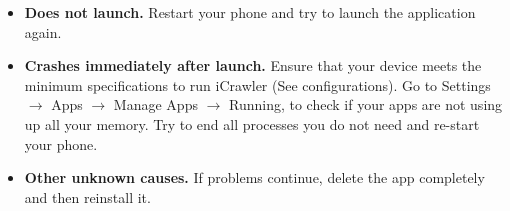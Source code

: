 \documentclass[hidelinks, 12pt, oneside]{article}
\begin{document}
	\begin{itemize}
		\item \textbf{Does not launch.} Restart your phone and try to launch the application again.
		\item\textbf{Crashes immediately after launch.} Ensure that your device meets the minimum specifications to run
		 iCrawler (See configurations). Go to Settings $\rightarrow$ Apps $\rightarrow$ Manage Apps $\rightarrow$ Running, to check if your apps are not using up all
		  your memory. Try to end all processes you do not need and re-start your phone.
		\item \textbf{Other unknown causes.} If problems continue, delete the app completely and then reinstall it.\
	\end{itemize}
		
\end{document}

